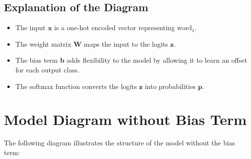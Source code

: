 \begin{notechapter}
\begin{center}
\end{center}

\subsection{Explanation of the Diagram}
\begin{itemize}
    \item The input \(\mathbf{x}\) is a one-hot encoded vector representing
          \(\text{word}_1\).
    \item The weight matrix \(\mathbf{W}\) maps the input to the logits
          \(\mathbf{z}\).
    \item The bias term \(\mathbf{b}\) adds flexibility to the model by
          allowing it to learn an offset for each output class.
    \item The softmax function converts the logits \(\mathbf{z}\) into
          probabilities \(\mathbf{p}\).
\end{itemize}

\section{Model Diagram without Bias Term}
The following diagram illustrates the structure of the model without the bias
term:


\begin{minipage}[t]{.62\textwidth}
\raggedright
\begin{center}

      \begin{tikzpicture}[x=1.5cm, y=1.5cm, >=stealth]
      

\end{tikzpicture}
\end{center}
\end{minipage}
\end{notechapter}

